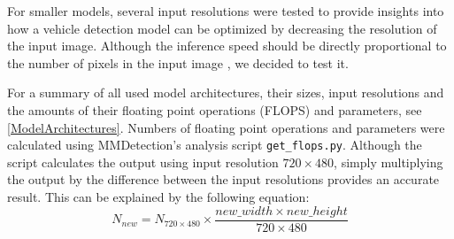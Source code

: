 For smaller models, several input resolutions were tested to provide insights into
how a vehicle detection model can be optimized by decreasing the resolution of
the input image. Although the inference speed should be directly proportional to
the number of pixels in the input image , we decided to test it.

For a summary of all used model architectures, their sizes, input resolutions and the
amounts of their floating point operations (FLOPS) and parameters, see
\autoref{ModelArchitectures}. Numbers of floating point operations and
parameters were calculated using MMDetection's analysis script
\verb|get_flops.py|. Although the script calculates the output using input resolution
$720 \times 480$, simply multiplying the output by the difference between the
input resolutions provides an accurate result. This can be explained by the following
equation:
\begin{equation}
    N_{new} = N_{720 \times 480} \times \frac{new\_width \times new\_height}{720 \times 480}
\end{equation}



